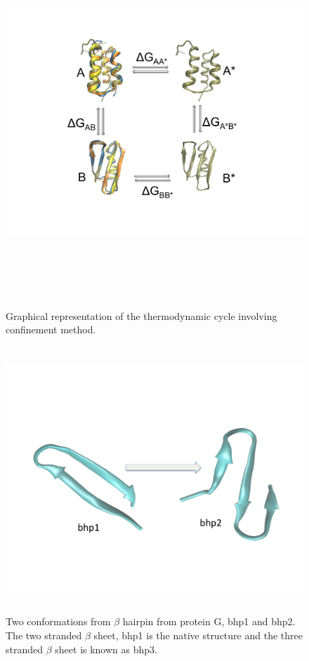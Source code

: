 \documentclass[12pt]{article}
\begin{document}
\begin{figure}
\begin{center}
\includegraphics[width=14cm,height=14cm]{method.pdf}
\end{center}
\caption{Graphical representation of the thermodynamic cycle involving confinement method.}
\label{fig:method}
\end{figure}


\begin{figure} 
\begin{center} 
\includegraphics[width=12cm,height=10cm]{bhp.pdf}
\end{center}
\caption{Two conformations from $\beta$ hairpin from protein G, bhp1 and bhp2. The two stranded $\beta$ sheet, bhp1 is the native structure and the three stranded $\beta$ sheet is known as bhp3.}
\label{fig:bhp_conf}
\end{figure}
\end{document}
